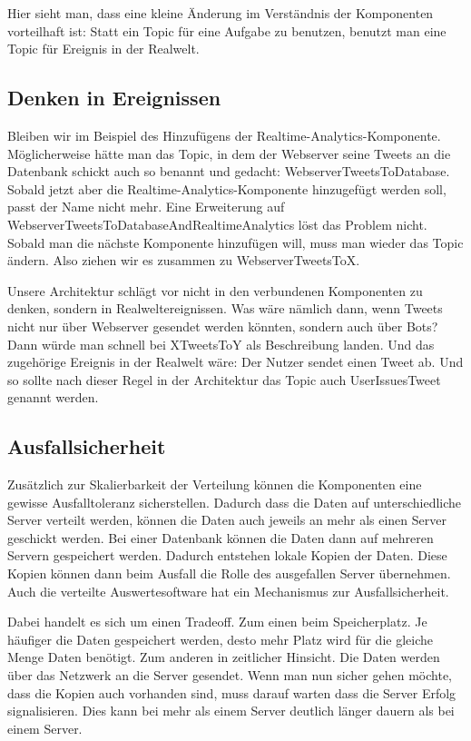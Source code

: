 \begin{itemize}
Hier sieht man, dass eine kleine Änderung im Verständnis der Komponenten vorteilhaft ist: Statt ein Topic für eine Aufgabe
zu benutzen, benutzt man eine Topic für Ereignis in der Realwelt.

\subsection{Denken in Ereignissen}
Bleiben wir im Beispiel des Hinzufügens der Realtime-Analytics-Komponente. Möglicherweise hätte man das Topic, in dem
der Webserver seine Tweets an die Datenbank schickt auch so benannt und gedacht: WebserverTweetsToDatabase. Sobald
jetzt aber die Realtime-Analytics-Komponente hinzugefügt werden soll, passt der Name nicht mehr. Eine Erweiterung auf
WebserverTweetsToDatabaseAndRealtimeAnalytics löst das Problem nicht. Sobald man die nächste Komponente hinzufügen
will, muss man wieder das Topic ändern. Also ziehen wir es zusammen zu WebserverTweetsToX. 

Unsere Architektur schlägt vor nicht in den verbundenen Komponenten zu denken, sondern in Realweltereignissen.
Was wäre nämlich dann, wenn Tweets nicht nur über Webserver gesendet werden könnten, sondern auch über Bots?
Dann würde man schnell bei XTweetsToY als Beschreibung landen. Und das zugehörige Ereignis in der Realwelt wäre:
Der Nutzer sendet einen Tweet ab. Und so sollte nach dieser Regel in der Architektur das Topic auch UserIssuesTweet genannt
werden.


\subsection{Ausfallsicherheit}

Zusätzlich zur Skalierbarkeit der Verteilung können die Komponenten eine gewisse Ausfalltoleranz sicherstellen.
Dadurch dass die Daten auf unterschiedliche Server verteilt werden, können die Daten auch jeweils an mehr als
einen Server geschickt werden.  Bei einer Datenbank können die Daten dann auf mehreren Servern gespeichert werden.
Dadurch entstehen lokale Kopien der Daten. Diese Kopien können dann beim Ausfall die Rolle des ausgefallen
Server übernehmen. Auch die verteilte Auswertesoftware hat ein Mechanismus zur Ausfallsicherheit.

Dabei handelt es sich um einen Tradeoff. Zum einen beim Speicherplatz. Je häufiger die Daten
gespeichert werden, desto mehr Platz wird für die gleiche Menge Daten benötigt. Zum anderen in zeitlicher Hinsicht.
Die Daten werden über das Netzwerk an die Server gesendet. Wenn man nun sicher gehen möchte, dass die Kopien
auch vorhanden sind, muss darauf warten dass die Server Erfolg signalisieren. Dies kann bei mehr als einem Server deutlich
länger dauern als bei einem Server.


\end{itemize}
